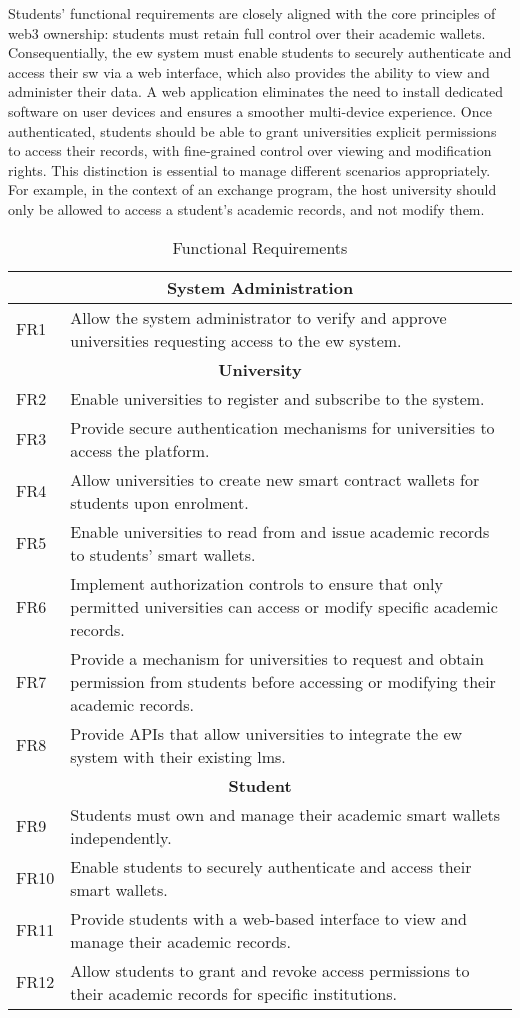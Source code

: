 Students' functional requirements are closely aligned with the core principles of \Gls{web3} ownership: students must retain full control over their academic wallets. Consequentially, the \acrshort{ew} system must enable students to securely authenticate and access their \acrshort{sw} via a web interface, which also provides the ability to view and administer their data. A web application eliminates the need to install dedicated software on user devices and ensures a smoother multi-device experience.
Once authenticated, students should be able to grant universities explicit permissions to access their records, with fine-grained control over viewing and modification rights. This distinction is essential to manage different scenarios appropriately. For example, in the context of an exchange program, the host university should only be allowed to access a student's academic records, and not modify them.

\begin{table}
\centering
\caption{Functional Requirements}
\label{tab:funcReq}
\begin{tabular}{|p{1.0cm}|p{11cm}|}
\hline
\multicolumn{2}{|c|}{\textbf{System Administration}} \\
\hline
FR1 & Allow the system administrator to verify and approve universities requesting access to the \acrlong{ew} system. \\
\hline
\multicolumn{2}{|c|}{\textbf{University}} \\
\hline
FR2 & Enable universities to register and subscribe to the system. \\
FR3 & Provide secure authentication mechanisms for universities to access the platform. \\
FR4 & Allow universities to create new smart contract wallets for students upon enrolment. \\
FR5 & Enable universities to read from and issue academic records to students' smart wallets. \\
FR6 & Implement authorization controls to ensure that only permitted universities can access or modify specific academic records. \\
FR7 & Provide a mechanism for universities to request and obtain permission from students before accessing or modifying their academic records. \\
FR8 & Provide APIs that allow universities to integrate the \acrlong{ew} system with their existing \acrlong{lms}. \\
\hline
\multicolumn{2}{|c|}{\textbf{Student}} \\
\hline
FR9  & Students must own and manage their academic smart wallets independently. \\
FR10 & Enable students to securely authenticate and access their smart wallets. \\
FR11 & Provide students with a web-based interface to view and manage their academic records. \\
FR12 & Allow students to grant and revoke access permissions to their academic records for specific institutions. \\
\hline
\end{tabular}
\end{table}

